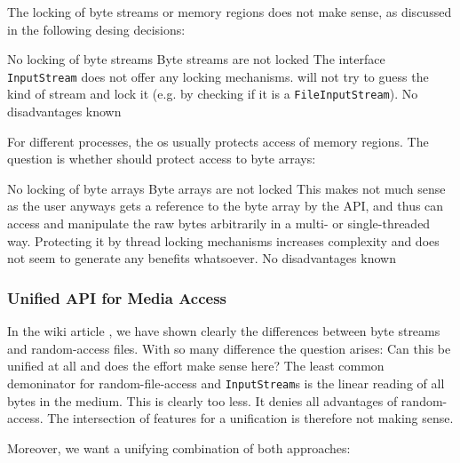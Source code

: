 The locking of byte streams or memory regions does not make sense, as discussed in the following desing decisions:

{%
No locking of byte streams 
}
{%
Byte streams are not locked
}
{%
The interface \texttt{InputStream} does not offer any locking mechanisms. \LibName{} will not try to guess the kind of stream and lock it (e.g. by checking if it is a \texttt{FileInputStream}).
}
{%
No disadvantages known
}

For different processes, the os usually protects access of memory regions. The question is whether \LibName{} should protect access to byte arrays:

{%
No locking of byte arrays
}
{%
Byte arrays are not locked
}
{%
This makes not much sense as the user anyways gets a reference to the byte array by the API, and thus can access and manipulate the raw bytes arbitrarily in a multi- or single-threaded way. Protecting it by thread locking mechanisms increases complexity and does not seem to generate any benefits whatsoever.
}
{%
No disadvantages known
}


\subsubsection{Unified API for Media Access}
\label{sec:PerfMediaZUGR}

In the wiki article \cite{PWikIO}, we have shown clearly the differences between byte streams and random-access files. With so many difference the question arises: Can this be unified at all and does the effort make sense here? The least common demoninator for random-file-access and \texttt{InputStream}s is the linear reading of all bytes in the medium. This is clearly too less. It denies all advantages of random-access. The intersection of features for a unification is therefore not making sense.

Moreover, we want a unifying combination of both approaches:

